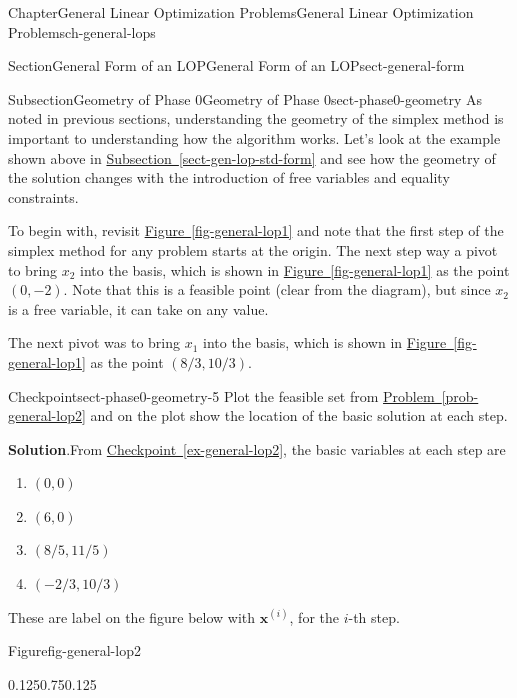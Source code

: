 \documentclass[oneside,10pt,]{book}
\newcommand{\blocktitlefont}{\relax}
\newcommand{\xreffont}{\relax}
\numberwithin{equation}{section}
\begin{document}
\begin{chapterptx}{Chapter}{General Linear Optimization Problems}{}{General Linear Optimization Problems}{}{}{ch-general-lops}
\begin{sectionptx}{Section}{General Form of an LOP}{}{General Form of an LOP}{}{}{sect-general-form}
\typeout{************************************************}
%
\begin{subsectionptx}{Subsection}{Geometry of Phase 0}{}{Geometry of Phase 0}{}{}{sect-phase0-geometry}
As noted in previous sections, understanding the geometry of the simplex method is important to understanding how the algorithm works. Let's look at the example shown above in \hyperref[sect-gen-lop-std-form]{Subsection~{\xreffont\ref{sect-gen-lop-std-form}}} and see how the geometry of the solution changes with the introduction of free variables and equality constraints.%
\par
To begin with, revisit \hyperref[fig-general-lop1]{Figure~{\xreffont\ref{fig-general-lop1}}} and note that the first step of the simplex method for any problem starts at the origin. The next step way a pivot to bring \(x_2\) into the basis, which is shown in \hyperref[fig-general-lop1]{Figure~{\xreffont\ref{fig-general-lop1}}} as the point \((0,-2)\). Note that this is a feasible point (clear from the diagram), but since \(x_2\) is a free variable, it can take on any value.%
\par
The next pivot was to bring \(x_1\) into the basis, which is shown in \hyperref[fig-general-lop1]{Figure~{\xreffont\ref{fig-general-lop1}}} as the point \((8/3,10/3)\).%
\begin{inlineexercise}{Checkpoint}{}{sect-phase0-geometry-5}%
Plot the feasible set from \hyperref[prob-general-lop2]{Problem~{\xreffont\ref{prob-general-lop2}}} and on the plot show the location of the basic solution at each step.%
\par\smallskip%
\noindent\textbf{\blocktitlefont Solution}.\hypertarget{sect-phase0-geometry-5-2}{}\quad{}From \hyperref[ex-general-lop2]{Checkpoint~{\xreffont\ref{ex-general-lop2}}}, the basic variables at each step are%
\par
%
\begin{enumerate}
\item{}\(\displaystyle (0,0)\)%
\item{}\(\displaystyle (6,0)\)%
\item{}\(\displaystyle (8/5, 11/5)\)%
\item{}\(\displaystyle (-2/3, 10/3)\)%
\end{enumerate}
%
\par
These are label on the figure below with \(\boldsymbol{x}^{(i)}\), for the \(i\)-th step.%
\begin{figureptx}{Figure}{}{fig-general-lop2}{}%
\begin{image}{0.125}{0.75}{0.125}{}%

\end{image}
\end{figureptx}
\end{inlineexercise}
\end{subsectionptx}
\end{sectionptx}
\end{chapterptx}
\end{document}

